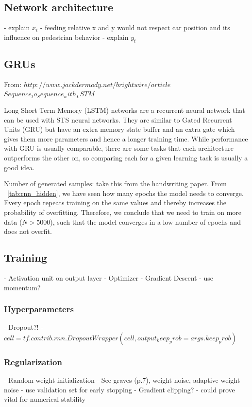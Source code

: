 \subsection{Network architecture}
- explain $x_t$
	- feeding relative x and y would not respect car position and its influence on pedestrian behavior
- explain $y_t$

\subsection{GRUs}
From: $http://www.jackdermody.net/brightwire/article$
$Sequence_to_Sequence_with_LSTM$

Long Short Term Memory (LSTM) networks are a recurrent neural network that can be used with STS neural networks. They are similar to Gated Recurrent Units (GRU) but have an extra memory state buffer and an extra gate which gives them more parameters and hence a longer training time. While performance with GRU is usually comparable, there are some tasks that each architecture outperforms the other on, so comparing each for a given learning task is usually a good idea.


Number of generated samples: take this from the handwriting paper.
From ~\cref{tab:rnn_hidden}, we have seen how many epochs the model needs to converge. Every epoch repeats training on the same values and thereby increases the probability of overfitting. Therefore, we conclude that we need to train on more data ($N > 5000$), such that the model converges in a low number of epochs and does not overfit.

\subsection{Training}
- Activation unit on output layer
- Optimizer
	- Gradient Descent
		- use momentum?

\subsubsection{Hyperparameters}
- Dropout?!
	- $cell = tf.contrib.rnn.DropoutWrapper(cell, output_keep_prob = args.keep_prob)$

\subsubsection{Regularization}
- Random weight initialization
	- See graves (p.7), weight noise, adaptive weight noise
- use validation set for early stopping
- Gradient clipping?
	- could prove vital for numerical stability
	
